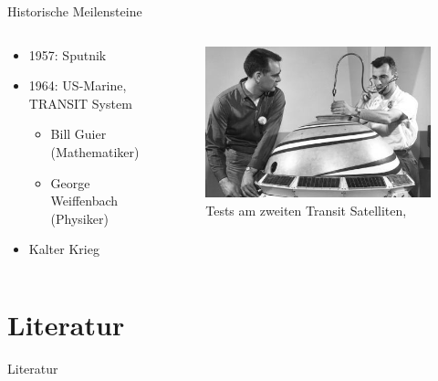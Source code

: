        \begin{frame}{Historische Meilensteine}
           \begin{columns}
               \begin{column}{0.5\paperwidth}
                   \begin{itemize}
                       \item 1957: Sputnik
                       \item 1964: US-Marine, TRANSIT System
                       \begin{itemize}
                           \item Bill Guier (Mathematiker)
                           \item George Weiffenbach (Physiker)
                       \end{itemize}
                       \item Kalter Krieg
                   \end{itemize}
               \end{column}
               \begin{column}{0.5\paperwidth}
                   \begin{figure}
                       \includegraphics[width=0.4\paperwidth]{images/transit-satellite.jpg}
                       \caption{Tests am zweiten Transit Satelliten, \cite{TimeAndNavigation}}
                       \label{fig:transit}
                   \end{figure}
               \end{column}
           \end{columns}
       \end{frame}

       \section{Literatur}
       \begin{frame}{Literatur}
           \printbibliography
       \end{frame}

